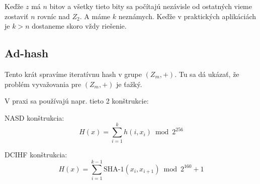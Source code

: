 Keďže $z$ má $n$ bitov a všetky tieto bity sa počítajú nezávisle od ostatných vieme
zostaviť $n$ rovníc nad $Z_2$. A máme $k$ neznámych. Keďže v praktických
aplikáciách je $k > n$ dostaneme skoro vždy riešenie.


\subsection{Ad-hash}

Tento krát spravíme iteratívnu hash v grupe $(Z_m, +)$.
Tu sa dá ukázať, že problém vyvažovania pre $(Z_m, +)$
je ťažký. 

V praxi sa používajú napr. tieto 2 konštrukcie:

NASD konštrukcia:
$$H(x) = \displaystyle\sum_{i=1}^k h(i, x_i) \bmod 2^{256}$$

DCIHF konštrukcia:
$$H(x) = \displaystyle\sum_{i=1}^{k-1} \textrm{SHA-1}(x_i, x_{i+1}) \bmod 2^{160}+1$$


